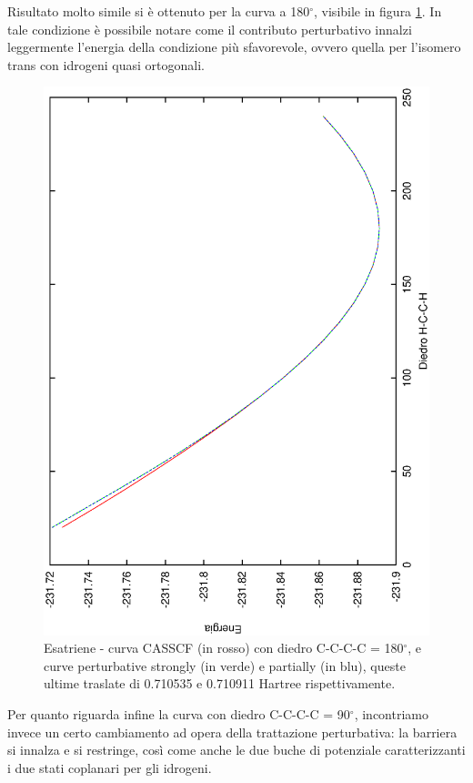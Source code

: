 Risultato molto simile si \`e ottenuto per la curva a 180$^{\circ}$, visibile
in figura \ref{fig:esatriene_perturb_c180}. In tale condizione \`e possibile
notare come il contributo perturbativo innalzi leggermente l'energia della
condizione pi\`u sfavorevole, ovvero quella per l'isomero trans con idrogeni
quasi ortogonali.

\begin{figure}[ht]
\begin{center}
\includegraphics[angle=270,width=12cm,keepaspectratio]{immagini/esatriene/perturb_c180.eps}
\caption{\small Esatriene - curva CASSCF (in rosso) con diedro C-C-C-C = 180$^{\circ}$, e curve perturbative
strongly (in verde) e partially (in blu), queste ultime traslate di 0.710535 e 0.710911 Hartree rispettivamente.}
\label{fig:esatriene_perturb_c180}
\end{center}
\end{figure}

Per quanto riguarda infine la curva con diedro C-C-C-C = 90$^{\circ}$,
incontriamo invece un certo cambiamento ad opera della trattazione
perturbativa: la barriera si innalza e si restringe, cos\`i come anche le due
buche di potenziale caratterizzanti i due stati coplanari per gli idrogeni. 

